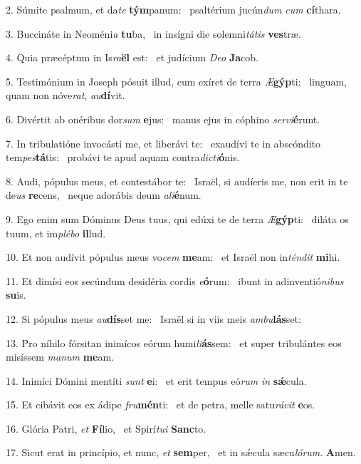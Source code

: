 2. Súmite psalmum, et da\textit{te} \textbf{tým}panum: \ast\  psaltérium jucún\textit{dum} \textit{cum} \textbf{cí}thara.\

3. Buccináte in Neoméni\textit{a} \textbf{tu}ba, \ast\  in insígni die solemni\textit{tá}\textit{tis} \textbf{ves}træ.\

4. Quia præcéptum in Is\textit{ra}\textbf{ël} est: \ast\  et judícium \textit{De}\textit{o} \textbf{Ja}cob.\

5. Testimónium in Joseph pósuit illud, cum exíret de terra \textit{Æ}\textbf{gýp}ti: \ast\  linguam, quam non nóve\textit{rat}, \textit{au}\textbf{dí}vit.\

6. Divértit ab onéribus dor\textit{sum} \textbf{e}jus: \ast\  manus ejus in cóphino \textit{ser}\textit{vi}\textbf{é}runt.\

7. In tribulatióne invocásti me, et liberávi te: \dag\  exaudívi te in abscóndito tem\textit{pes}\textbf{tá}tis: \ast\  probávi te apud aquam contra\textit{dic}\textit{ti}\textbf{ó}nis.\

8. Audi, pópulus meus, et contestábor te: \dag\  Israël, si audíeris me, non erit in te de\textit{us} \textbf{re}cens, \ast\  neque adorábis deum \textit{a}\textit{li}\textbf{é}num.\

9. Ego enim sum Dóminus Deus tuus, qui edúxi te de terra \textit{Æ}\textbf{gýp}ti: \ast\  diláta os tuum, et im\textit{plé}\textit{bo} \textbf{il}lud.\

10. Et non audívit pópulus meus vo\textit{cem} \textbf{me}am: \ast\  et Israël non in\textit{tén}\textit{dit} \textbf{mi}hi.\

11. Et dimísi eos secúndum desidéria cordis \textit{e}\textbf{ó}rum: \ast\  ibunt in adinventió\textit{ni}\textit{bus} \textbf{su}is.\

12. Si pópulus meus \textit{au}\textbf{dís}set me: \ast\  Israël si in viis meis \textit{am}\textit{bu}\textbf{lás}set:\

13. Pro níhilo fórsitan inimícos eórum humi\textit{li}\textbf{ás}sem: \ast\  et super tribulántes eos misíssem \textit{ma}\textit{num} \textbf{me}am.\

14. Inimíci Dómini mentíti \textit{sunt} \textbf{e}i: \ast\  et erit tempus eó\textit{rum} \textit{in} \textbf{sǽ}cula.\

15. Et cibávit eos ex ádipe \textit{fru}\textbf{mén}ti: \ast\  et de petra, melle satu\textit{rá}\textit{vit} \textbf{e}os.\

16. Glória Patri, \textit{et} \textbf{Fí}lio, \ast\  et Spirí\textit{tu}\textit{i} \textbf{Sanc}to.\

17. Sicut erat in princípio, et nunc, \textit{et} \textbf{sem}per, \ast\  et in sǽcula sæcu\textit{ló}\textit{rum}. \textbf{A}men.\

